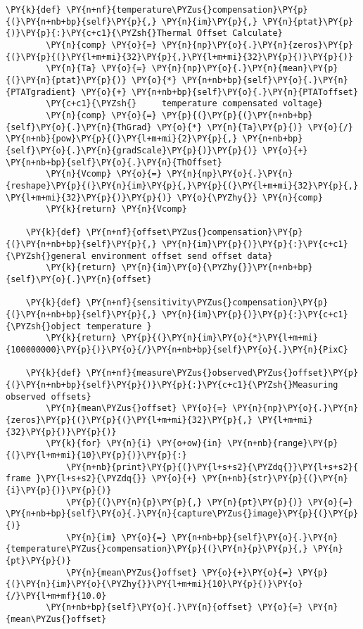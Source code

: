 \begin{tcolorbox}[breakable, size=fbox, boxrule=1pt, pad at break*=1mm,colback=cellbackground, colframe=cellborder]
\begin{Verbatim}[commandchars=\\\{\}]
    \PY{k}{def} \PY{n+nf}{temperature\PYZus{}compensation}\PY{p}{(}\PY{n+nb+bp}{self}\PY{p}{,} \PY{n}{im}\PY{p}{,} \PY{n}{ptat}\PY{p}{)}\PY{p}{:}\PY{c+c1}{\PYZsh{}Thermal Offset Calculate}
	    \PY{n}{comp} \PY{o}{=} \PY{n}{np}\PY{o}{.}\PY{n}{zeros}\PY{p}{(}\PY{p}{(}\PY{l+m+mi}{32}\PY{p}{,}\PY{l+m+mi}{32}\PY{p}{)}\PY{p}{)}
	    \PY{n}{Ta} \PY{o}{=} \PY{n}{np}\PY{o}{.}\PY{n}{mean}\PY{p}{(}\PY{n}{ptat}\PY{p}{)} \PY{o}{*} \PY{n+nb+bp}{self}\PY{o}{.}\PY{n}{PTATgradient} \PY{o}{+} \PY{n+nb+bp}{self}\PY{o}{.}\PY{n}{PTAToffset}
		\PY{c+c1}{\PYZsh{}     temperature compensated voltage}
	    \PY{n}{comp} \PY{o}{=} \PY{p}{(}\PY{p}{(}\PY{n+nb+bp}{self}\PY{o}{.}\PY{n}{ThGrad} \PY{o}{*} \PY{n}{Ta}\PY{p}{)} \PY{o}{/} \PY{n+nb}{pow}\PY{p}{(}\PY{l+m+mi}{2}\PY{p}{,} \PY{n+nb+bp}{self}\PY{o}{.}\PY{n}{gradScale}\PY{p}{)}\PY{p}{)} \PY{o}{+} \PY{n+nb+bp}{self}\PY{o}{.}\PY{n}{ThOffset}
	    \PY{n}{Vcomp} \PY{o}{=} \PY{n}{np}\PY{o}{.}\PY{n}{reshape}\PY{p}{(}\PY{n}{im}\PY{p}{,}\PY{p}{(}\PY{l+m+mi}{32}\PY{p}{,} \PY{l+m+mi}{32}\PY{p}{)}\PY{p}{)} \PY{o}{\PYZhy{}} \PY{n}{comp}
	    \PY{k}{return} \PY{n}{Vcomp}

	\PY{k}{def} \PY{n+nf}{offset\PYZus{}compensation}\PY{p}{(}\PY{n+nb+bp}{self}\PY{p}{,} \PY{n}{im}\PY{p}{)}\PY{p}{:}\PY{c+c1}{\PYZsh{}general environment offset send offset data}
		\PY{k}{return} \PY{n}{im}\PY{o}{\PYZhy{}}\PY{n+nb+bp}{self}\PY{o}{.}\PY{n}{offset}
		
	\PY{k}{def} \PY{n+nf}{sensitivity\PYZus{}compensation}\PY{p}{(}\PY{n+nb+bp}{self}\PY{p}{,} \PY{n}{im}\PY{p}{)}\PY{p}{:}\PY{c+c1}{\PYZsh{}object temperature }
		\PY{k}{return} \PY{p}{(}\PY{n}{im}\PY{o}{*}\PY{l+m+mi}{100000000}\PY{p}{)}\PY{o}{/}\PY{n+nb+bp}{self}\PY{o}{.}\PY{n}{PixC}

	\PY{k}{def} \PY{n+nf}{measure\PYZus{}observed\PYZus{}offset}\PY{p}{(}\PY{n+nb+bp}{self}\PY{p}{)}\PY{p}{:}\PY{c+c1}{\PYZsh{}Measuring observed offsets}
		\PY{n}{mean\PYZus{}offset} \PY{o}{=} \PY{n}{np}\PY{o}{.}\PY{n}{zeros}\PY{p}{(}\PY{p}{(}\PY{l+m+mi}{32}\PY{p}{,} \PY{l+m+mi}{32}\PY{p}{)}\PY{p}{)}
		\PY{k}{for} \PY{n}{i} \PY{o+ow}{in} \PY{n+nb}{range}\PY{p}{(}\PY{l+m+mi}{10}\PY{p}{)}\PY{p}{:}
			\PY{n+nb}{print}\PY{p}{(}\PY{l+s+s2}{\PYZdq{}}\PY{l+s+s2}{    frame }\PY{l+s+s2}{\PYZdq{}} \PY{o}{+} \PY{n+nb}{str}\PY{p}{(}\PY{n}{i}\PY{p}{)}\PY{p}{)}
			\PY{p}{(}\PY{n}{p}\PY{p}{,} \PY{n}{pt}\PY{p}{)} \PY{o}{=} \PY{n+nb+bp}{self}\PY{o}{.}\PY{n}{capture\PYZus{}image}\PY{p}{(}\PY{p}{)}
			\PY{n}{im} \PY{o}{=} \PY{n+nb+bp}{self}\PY{o}{.}\PY{n}{temperature\PYZus{}compensation}\PY{p}{(}\PY{n}{p}\PY{p}{,} \PY{n}{pt}\PY{p}{)}
			\PY{n}{mean\PYZus{}offset} \PY{o}{+}\PY{o}{=} \PY{p}{(}\PY{n}{im}\PY{o}{\PYZhy{}}\PY{l+m+mi}{10}\PY{p}{)}\PY{o}{/}\PY{l+m+mf}{10.0}	
		\PY{n+nb+bp}{self}\PY{o}{.}\PY{n}{offset} \PY{o}{=} \PY{n}{mean\PYZus{}offset}



\end{Verbatim}
\end{tcolorbox}
